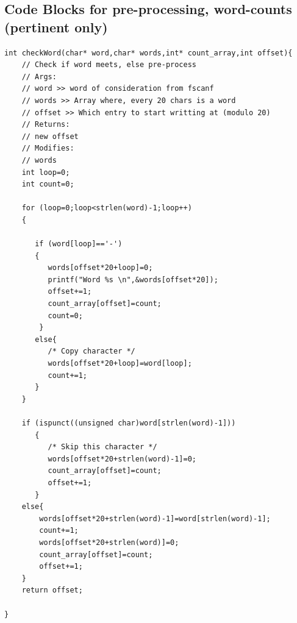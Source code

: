\subsection {Code Blocks for pre-processing, word-counts (pertinent only)}
\begin{lstlisting}
int checkWord(char* word,char* words,int* count_array,int offset){
    // Check if word meets, else pre-process
    // Args:
    // word >> word of consideration from fscanf
    // words >> Array where, every 20 chars is a word
    // offset >> Which entry to start writting at (modulo 20)
    // Returns:
    // new offset
    // Modifies:
    // words
    int loop=0;
    int count=0;

    for (loop=0;loop<strlen(word)-1;loop++)
    {
       
       if (word[loop]=='-')
       {
          words[offset*20+loop]=0;
          printf("Word %s \n",&words[offset*20]);
          offset+=1;
          count_array[offset]=count;
          count=0;
        }
       else{
          /* Copy character */
          words[offset*20+loop]=word[loop];
          count+=1;
       }
    }

    if (ispunct((unsigned char)word[strlen(word)-1]))
       {
          /* Skip this character */
          words[offset*20+strlen(word)-1]=0;
          count_array[offset]=count;
          offset+=1;
       }
    else{
        words[offset*20+strlen(word)-1]=word[strlen(word)-1];
        count+=1;
        words[offset*20+strlen(word)]=0;
        count_array[offset]=count;
        offset+=1;
    }
    return offset;

}

\end{lstlisting}
\bigskip

